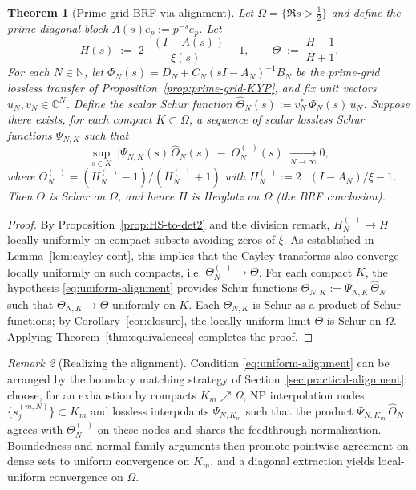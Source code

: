 \documentclass[11pt]{article}
\newtheorem{theorem}{Theorem}
\theoremstyle{definition}
\theoremstyle{remark}
\newtheorem{remark}[theorem]{Remark}
\newcommand{\C}{\mathbb{C}}
\newcommand{\N}{\mathbb{N}}
\DeclareMathOperator{\dettwo}{det_2}
\begin{document}
\begin{theorem}[Prime-grid BRF via alignment]\label{thm:prime-grid-BRF}
Let \(\Omega=\{\Re s>\tfrac12\}\) and define the prime-diagonal block \(A(s)e_p:=p^{-s}e_p\). Let
\[
 H(s)\;:=\;2\,\frac{\dettwo(I-A(s))}{\xi(s)}-1,\qquad \Theta\;:=\;\frac{H-1}{H+1}.
\]
For each \(N\in\N\), let \(\Phi_N(s)=D_N+C_N(sI-A_N)^{-1}B_N\) be the prime-grid lossless transfer of Proposition~\ref{prop:prime-grid-KYP}, and fix unit vectors \(u_N,v_N\in\C^N\). Define the scalar Schur function \(\widehat\Theta_N(s):=v_N^*\,\Phi_N(s)\,u_N\). Suppose there exists, for each compact \(K\subset\Omega\), a sequence of scalar lossless Schur functions \(\Psi_{N,K}\) such that
\begin{equation}\label{eq:uniform-alignment}
 \sup_{s\in K}\ \big|\Psi_{N,K}(s)\,\widehat\Theta_N(s)\; -\; \Theta_N^{(\dettwo)}(s)\big|\xrightarrow[N\to\infty]{}0,
\end{equation}
where \(\Theta_N^{(\dettwo)}=(H_N^{(\dettwo)}-1)/(H_N^{(\dettwo)}+1)\) with \(H_N^{(\dettwo)}:=2\,\dettwo(I-A_N)/\xi-1\). Then \(\Theta\) is Schur on \(\Omega\), and hence \(H\) is Herglotz on \(\Omega\) (the BRF conclusion).
\end{theorem}
\begin{proof}
By Proposition~\ref{prop:HS-to-det2} and the division remark, \(H_N^{(\dettwo)}\to H\) locally uniformly on compact subsets avoiding zeros of \(\xi\). As established in Lemma~\ref{lem:cayley-cont}, this implies that the Cayley transforms also converge locally uniformly on such compacts, i.e. \(\Theta_N^{(\dettwo)}\to\Theta\). For each compact \(K\), the hypothesis \eqref{eq:uniform-alignment} provides Schur functions \(\Theta_{N,K}:=\Psi_{N,K}\,\widehat\Theta_N\) such that \(\Theta_{N,K}\to\Theta\) uniformly on \(K\). Each \(\Theta_{N,K}\) is Schur as a product of Schur functions; by Corollary~\ref{cor:closure}, the locally uniform limit \(\Theta\) is Schur on \(\Omega\). Applying Theorem~\ref{thm:equivalences} completes the proof.
\end{proof}
\begin{remark}[Realizing the alignment]
Condition \eqref{eq:uniform-alignment} can be arranged by the boundary matching strategy of Section~\ref{sec:practical-alignment}: choose, for an exhaustion by compacts \(K_m\nearrow\Omega\), NP interpolation nodes \(\{s_{j}^{(m,N)}\}\subset K_m\) and lossless interpolants \(\Psi_{N,K_m}\) such that the product \(\Psi_{N,K_m}\,\widehat\Theta_N\) agrees with \(\Theta_N^{(\dettwo)}\) on these nodes and shares the feedthrough normalization. Boundedness and normal-family arguments then promote pointwise agreement on dense sets to uniform convergence on \(K_m\), and a diagonal extraction yields local-uniform convergence on \(\Omega\).
\end{remark}
\end{document}
